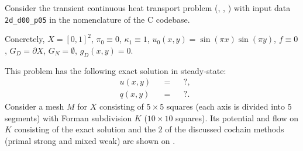\begin{example}
  Consider the transient continuous heat transport problem
  (,
   ,
   )
  with input data \verb|2d_d00_p05| in the nomenclature of the C codebase.

  Concretely,
    $X = [0, 1]^2$,
    $\pi_0 \equiv 0$,
    $\kappa_1 \equiv 1$,
    $u_0(x, y) = \sin(\pi x) \sin(\pi y)$,
    $f \equiv 0$,
    $G_D = \partial X$,
    $G_N = \emptyset$,
    $g_D(x, y) = 0$.

  This problem has the following exact solution in steady-state:
  \begin{subequations}
    \begin{alignat}{3}
      & u(x, y) && = && ?, \\
      & q(x, y) && = && ?.
    \end{alignat}
  \end{subequations}
  Consider a mesh $M$ for $X$ consisting of $5 \times 5$ squares (each axis is
  divided into $5$ segments) with Forman subdivision $K$
  ($10 \times 10$ squares).
  Its potential and flow on $K$ consisting of the exact solution and the $2$ of
  the discussed cochain methods (primal strong and mixed weak) are shown on
  .
\end{example}
